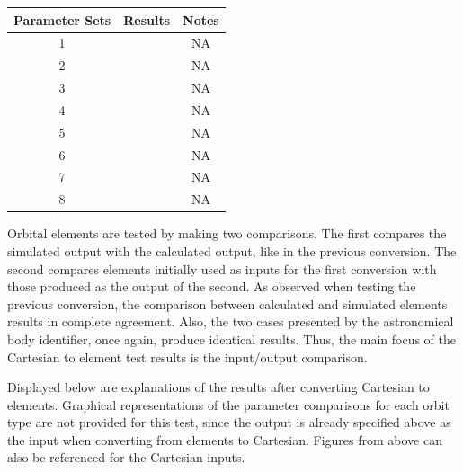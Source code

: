 \begin{itemize}
\begin{table}[H]
\begin{tabular}{c|c|c}
			\textbf{Parameter Sets} & \textbf{Results} & \textbf{Notes} 									\\ \hline
			1 & \color{Green}{PASSED} & NA\\
			2 & \color{Green}{PASSED} & NA\\
			3 & \color{Green}{PASSED} & NA\\
			4 & \color{Green}{PASSED} & NA\\
			5 & \color{Green}{PASSED} & NA\\
			6 & \color{Green}{PASSED} & NA\\
			7 & \color{Green}{PASSED} & NA\\
			8 & \color{Green}{PASSED} & NA\\
			\hline
		\end{tabular}
	\end{table}
	Orbital elements are tested by making two comparisons. The first compares the simulated output with the calculated output, like in the previous conversion. The second compares elements initially used as inputs for the first conversion with those produced as the output of the second. As observed when testing the previous conversion, the comparison between calculated and simulated elements results in complete agreement. Also, the two cases presented by the astronomical body identifier, once again, produce identical results. Thus, the main focus of the Cartesian to element test results is the input/output comparison.
	
	Displayed below are explanations of the results after converting Cartesian to elements. Graphical representations of the parameter comparisons for each orbit type are not provided for this test, since the output is already specified above as the input when converting from elements to Cartesian. Figures from above can also be referenced for the Cartesian inputs. 
	

\end{itemize}
